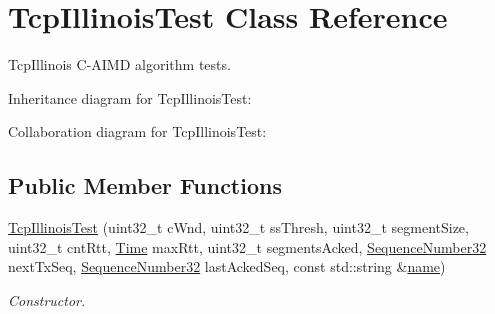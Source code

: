 \hypertarget{classTcpIllinoisTest}{}\section{Tcp\+Illinois\+Test Class Reference}
\label{classTcpIllinoisTest}


Tcp\+Illinois C-\/\+A\+I\+MD algorithm tests.  




Inheritance diagram for Tcp\+Illinois\+Test\+:


Collaboration diagram for Tcp\+Illinois\+Test\+:
\subsection*{Public Member Functions}
\begin{DoxyCompactItemize}
\item 
\hyperlink{classTcpIllinoisTest_a7ab925e01d6226fa8a77e29197428f88}{Tcp\+Illinois\+Test} (uint32\+\_\+t c\+Wnd, uint32\+\_\+t ss\+Thresh, uint32\+\_\+t segment\+Size, uint32\+\_\+t cnt\+Rtt, \hyperlink{classns3_1_1Time}{Time} max\+Rtt, uint32\+\_\+t segments\+Acked, \hyperlink{group__network_gacb2070e4e98d2d5135c9bede58f07a03}{Sequence\+Number32} next\+Tx\+Seq, \hyperlink{group__network_gacb2070e4e98d2d5135c9bede58f07a03}{Sequence\+Number32} last\+Acked\+Seq, const std\+::string \&\hyperlink{generate__test__data__lte__spectrum__model_8m_ab74e6bf80237ddc4109968cedc58c151}{name})
\begin{DoxyCompactList}\small\item\em Constructor. \end{DoxyCompactList}\end{DoxyCompactItemize}
